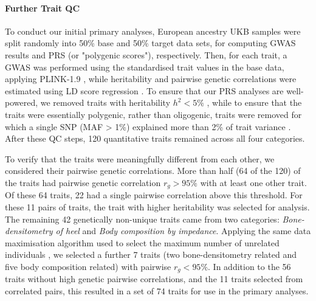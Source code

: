\documentclass[12pt]{zHenriquesLab-StyleBioRxiv}
\begin{document}
\paragraph*{Further Trait QC}
To conduct our initial primary analyses, European ancestry UKB samples were split 
randomly into 50\% base and 50\% target data sets, for computing GWAS results and PRS (or "polygenic scores"), respectively. Then, for each trait, a GWAS was performed using the standardised trait values in the base data, applying PLINK-1.9 \citep{plink, bt_10}, while heritability and pairwise genetic correlations were estimated using LD score regression \cite{ldsc}.  To ensure that our PRS analyses are well-powered, we removed traits with heritability $h^2<5\%$ \cite{guide_paper}, while to ensure that the traits were essentially polygenic, rather than oligogenic, traits were removed for which a single SNP (MAF > 1\%) explained more than 2\% of trait variance \cite{2prule}. After these QC steps, 120 quantitative traits remained across all four categories. 

To verify that the traits were meaningfully different from each other, we considered their  
pairwise genetic correlations. More than half (64 of the 120) of the traits had pairwise genetic 
correlation $r_g>95\%$ with at least one other trait. Of these 64 traits, 22 had a single pairwise 
correlation above this threshold. For these 11 pairs of traits, the trait with higher heritability was selected for analysis.  The remaining 42 genetically non-unique traits came from two categories: \textit{ Bone-densitometry of heel}  and \textit{ Body composition by impedance}. Applying the same data maximisation algorithm used to select the maximum number of unrelated individuals \citep{erase}, we selected a further 7 traits (two bone-densitometry related and five body composition related) with pairwise $r_g<95\%$.  In addition to the 56 traits without high genetic pairwise correlations, and the 11 traits selected from correlated pairs, this resulted in a set of 74 traits for use in the primary analyses. %
\end{document}
